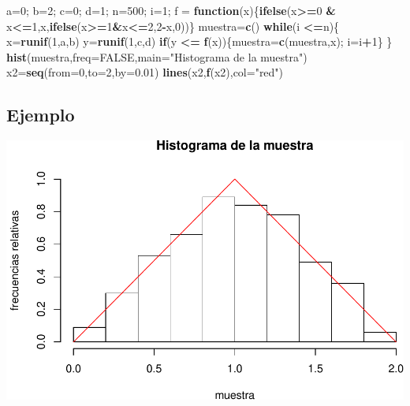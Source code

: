 \documentclass[]{book}
\newenvironment{Shaded}{\begin{snugshade}}{\end{snugshade}}
\newcommand{\ControlFlowTok}[1]{\textcolor[rgb]{0.13,0.29,0.53}{\textbf{#1}}}
\newcommand{\DataTypeTok}[1]{\textcolor[rgb]{0.13,0.29,0.53}{#1}}
\newcommand{\DecValTok}[1]{\textcolor[rgb]{0.00,0.00,0.81}{#1}}
\newcommand{\FloatTok}[1]{\textcolor[rgb]{0.00,0.00,0.81}{#1}}
\newcommand{\KeywordTok}[1]{\textcolor[rgb]{0.13,0.29,0.53}{\textbf{#1}}}
\newcommand{\NormalTok}[1]{#1}
\newcommand{\OperatorTok}[1]{\textcolor[rgb]{0.81,0.36,0.00}{\textbf{#1}}}
\newcommand{\OtherTok}[1]{\textcolor[rgb]{0.56,0.35,0.01}{#1}}
\newcommand{\StringTok}[1]{\textcolor[rgb]{0.31,0.60,0.02}{#1}}
\begin{document}
\begin{Shaded}
\begin{Highlighting}[]
\NormalTok{a=}\DecValTok{0}\NormalTok{; b=}\DecValTok{2}\NormalTok{; c=}\DecValTok{0}\NormalTok{; d=}\DecValTok{1}\NormalTok{; n=}\DecValTok{500}\NormalTok{; i=}\DecValTok{1}\NormalTok{;}
\NormalTok{f =}\StringTok{ }\ControlFlowTok{function}\NormalTok{(x)\{}\KeywordTok{ifelse}\NormalTok{(x}\OperatorTok{>=}\DecValTok{0} \OperatorTok{&}\StringTok{ }\NormalTok{x}\OperatorTok{<=}\DecValTok{1}\NormalTok{,x,}\KeywordTok{ifelse}\NormalTok{(x}\OperatorTok{>=}\DecValTok{1}\OperatorTok{&}\NormalTok{x}\OperatorTok{<=}\DecValTok{2}\NormalTok{,}\DecValTok{2}\OperatorTok{-}\NormalTok{x,}\DecValTok{0}\NormalTok{))\}}
\NormalTok{muestra=}\KeywordTok{c}\NormalTok{()}
\ControlFlowTok{while}\NormalTok{(i }\OperatorTok{<=}\NormalTok{n)\{}
\NormalTok{  x=}\KeywordTok{runif}\NormalTok{(}\DecValTok{1}\NormalTok{,a,b)}
\NormalTok{  y=}\KeywordTok{runif}\NormalTok{(}\DecValTok{1}\NormalTok{,c,d)}
  \ControlFlowTok{if}\NormalTok{(y }\OperatorTok{<=}\StringTok{ }\KeywordTok{f}\NormalTok{(x))\{muestra=}\KeywordTok{c}\NormalTok{(muestra,x); i=i}\OperatorTok{+}\DecValTok{1}\NormalTok{\}}
\NormalTok{\}}
\KeywordTok{hist}\NormalTok{(muestra,}\DataTypeTok{freq=}\OtherTok{FALSE}\NormalTok{,}\DataTypeTok{main=}\StringTok{"Histograma de la muestra"}\NormalTok{)}
\NormalTok{x2=}\KeywordTok{seq}\NormalTok{(}\DataTypeTok{from=}\DecValTok{0}\NormalTok{,}\DataTypeTok{to=}\DecValTok{2}\NormalTok{,}\DataTypeTok{by=}\FloatTok{0.01}\NormalTok{)}
\KeywordTok{lines}\NormalTok{(x2,}\KeywordTok{f}\NormalTok{(x2),}\DataTypeTok{col=}\StringTok{"red"}\NormalTok{)}
\end{Highlighting}
\end{Shaded}

\hypertarget{ejemplo-35}{%
\subsection{Ejemplo}\label{ejemplo-35}}

\includegraphics{curso-probabilidad-udemy_files/figure-latex/unnamed-chunk-114-1.pdf}
\end{document}
